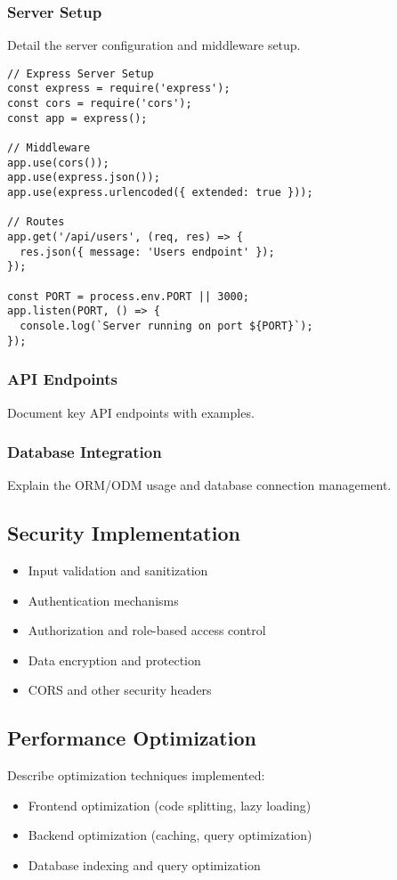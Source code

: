 \documentclass[12pt,a4paper]{article}
\begin{document}
\subsubsection{Server Setup}
Detail the server configuration and middleware setup.

\begin{lstlisting}[caption=Express Server Setup]
// Express Server Setup
const express = require('express');
const cors = require('cors');
const app = express();

// Middleware
app.use(cors());
app.use(express.json());
app.use(express.urlencoded({ extended: true }));

// Routes
app.get('/api/users', (req, res) => {
  res.json({ message: 'Users endpoint' });
});

const PORT = process.env.PORT || 3000;
app.listen(PORT, () => {
  console.log(`Server running on port ${PORT}`);
});
\end{lstlisting}

\subsubsection{API Endpoints}
Document key API endpoints with examples.

\subsubsection{Database Integration}
Explain the ORM/ODM usage and database connection management.

\subsection{Security Implementation}
\begin{itemize}
    \item Input validation and sanitization
    \item Authentication mechanisms
    \item Authorization and role-based access control
    \item Data encryption and protection
    \item CORS and other security headers
\end{itemize}

\subsection{Performance Optimization}
Describe optimization techniques implemented:
\begin{itemize}
    \item Frontend optimization (code splitting, lazy loading)
    \item Backend optimization (caching, query optimization)
    \item Database indexing and query optimization
\end{itemize}
\end{document}

